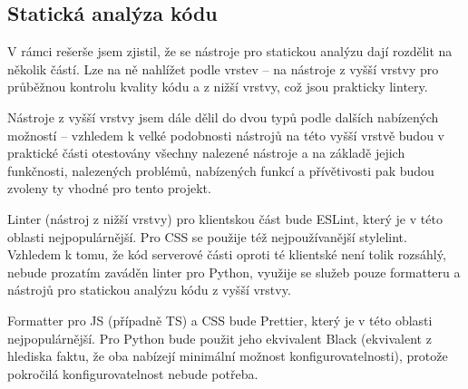 \subsection{Statická analýza kódu}

V rámci rešerše jsem zjistil, že se nástroje pro statickou analýzu dají rozdělit na několik částí. Lze na ně nahlížet podle vrstev -- na nástroje z vyšší vrstvy pro průběžnou kontrolu kvality kódu a z nižší vrstvy, což jsou prakticky lintery.

Nástroje z vyšší vrstvy jsem dále dělil do dvou typů podle dalších nabízených možností -- vzhledem k velké podobnosti nástrojů na této vyšší vrstvě budou v praktické části otestovány všechny nalezené nástroje a na základě jejich funkčnosti, nalezených problémů, nabízených funkcí a přívětivosti pak budou zvoleny ty vhodné pro tento projekt.

Linter (nástroj z nižší vrstvy) pro klientskou část bude ESLint, který je v této oblasti nejpopulárnější. Pro CSS se použije též nejpoužívanější stylelint. Vzhledem k tomu, že kód serverové části oproti té klientské není tolik rozsáhlý, nebude prozatím zaváděn linter pro Python, využije se služeb pouze formatteru a nástrojů pro statickou analýzu kódu z vyšší vrstvy.

Formatter pro JS (případně TS) a CSS bude Prettier, který je v této oblasti nejpopulárnější. Pro Python bude použit jeho ekvivalent Black (ekvivalent z hlediska faktu, že oba nabízejí minimální možnost konfigurovatelnosti), protože pokročilá konfigurovatelnost nebude potřeba.
